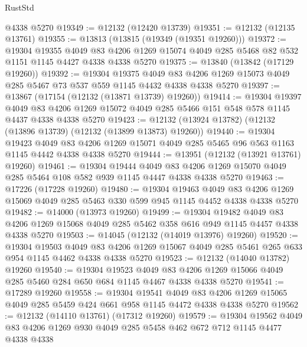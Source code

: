 \begin{lexlean}{RustStd}
\begin{coremodule}
    @4338
    @5270
@19349 := @12132 (@12420 @13739)
@19351 := @12132 (@12135 @13761)
@19355 := @13813 (@13815 (@19349 (@19351 @19260)))
@19372 := @19304
    @19355
    @4049
    @83
    @4206
    @1269
    @15074
    @4049
    @285
    @5468
    @82
    @532
    @1151
    @1145
    @4427
    @4338
    @4338
    @5270
@19375 := @13840 (@13842 (@17129 @19260))
@19392 := @19304
    @19375
    @4049
    @83
    @4206
    @1269
    @15073
    @4049
    @285
    @5467
    @73
    @537
    @559
    @1145
    @4432
    @4338
    @4338
    @5270
@19397 := @13867 (@17154 (@12132 (@13871 @13739) @19260))
@19414 := @19304
    @19397
    @4049
    @83
    @4206
    @1269
    @15072
    @4049
    @285
    @5466
    @151
    @548
    @578
    @1145
    @4437
    @4338
    @4338
    @5270
@19423 := @12132 (@13924 @13782) (@12132 (@13896 @13739) (@12132 (@13899 @13873) @19260))
@19440 := @19304
    @19423
    @4049
    @83
    @4206
    @1269
    @15071
    @4049
    @285
    @5465
    @96
    @563
    @1163
    @1145
    @4442
    @4338
    @4338
    @5270
@19444 := @13951 (@12132 (@13921 @13761) @19260)
@19461 := @19304
    @19444
    @4049
    @83
    @4206
    @1269
    @15070
    @4049
    @285
    @5464
    @108
    @582
    @939
    @1145
    @4447
    @4338
    @4338
    @5270
@19463 := @17226 (@17228 @19260)
@19480 := @19304
    @19463
    @4049
    @83
    @4206
    @1269
    @15069
    @4049
    @285
    @5463
    @330
    @599
    @945
    @1145
    @4452
    @4338
    @4338
    @5270
@19482 := @14000 (@13973 @19260)
@19499 := @19304
    @19482
    @4049
    @83
    @4206
    @1269
    @15068
    @4049
    @285
    @5462
    @358
    @616
    @949
    @1145
    @4457
    @4338
    @4338
    @5270
@19503 := @14045 (@12132 (@14019 @13976) @19260)
@19520 := @19304
    @19503
    @4049
    @83
    @4206
    @1269
    @15067
    @4049
    @285
    @5461
    @265
    @633
    @954
    @1145
    @4462
    @4338
    @4338
    @5270
@19523 := @12132 (@14040 @13782) @19260
@19540 := @19304
    @19523
    @4049
    @83
    @4206
    @1269
    @15066
    @4049
    @285
    @5460
    @284
    @650
    @684
    @1145
    @4467
    @4338
    @4338
    @5270
@19541 := @17289 @19260
@19558 := @19304
    @19541
    @4049
    @83
    @4206
    @1269
    @15065
    @4049
    @285
    @5459
    @424
    @661
    @958
    @1145
    @4472
    @4338
    @4338
    @5270
@19562 := @12132 (@14110 @13761) (@17312 @19260)
@19579 := @19304
    @19562
    @4049
    @83
    @4206
    @1269
    @930
    @4049
    @285
    @5458
    @462
    @672
    @712
    @1145
    @4477
    @4338
    @4338

\end{coremodule}
\end{lexlean}
